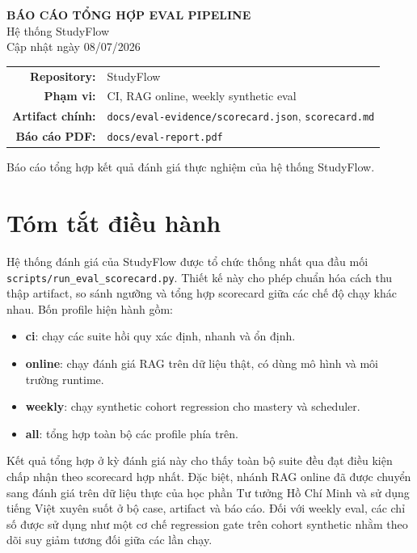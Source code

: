 \documentclass[12pt,a4paper]{article}
\begin{document}
\begin{titlepage}
\centering
{\LARGE \textbf{BÁO CÁO TỔNG HỢP EVAL PIPELINE}}\\[0.8em]
{\Large Hệ thống StudyFlow}\\[1.2em]
{\large Cập nhật ngày 08/07/2026}\\[2em]
\begin{tabular}{rl}
\textbf{Repository:} & StudyFlow \\
\textbf{Phạm vi:} & CI, RAG online, weekly synthetic eval \\
\textbf{Artifact chính:} & \texttt{docs/eval-evidence/scorecard.json}, \texttt{scorecard.md} \\
\textbf{Báo cáo PDF:} & \texttt{docs/eval-report.pdf} \\
\end{tabular}
\vfill
{\large Báo cáo tổng hợp kết quả đánh giá thực nghiệm của hệ thống StudyFlow.}
\end{titlepage}

\section{Tóm tắt điều hành}

Hệ thống đánh giá của StudyFlow được tổ chức thống nhất qua đầu mối \texttt{scripts/run\_eval\_scorecard.py}. Thiết kế này cho phép chuẩn hóa cách thu thập artifact, so sánh ngưỡng và tổng hợp scorecard giữa các chế độ chạy khác nhau. Bốn profile hiện hành gồm:
\begin{itemize}
    \item \textbf{ci}: chạy các suite hồi quy xác định, nhanh và ổn định.
    \item \textbf{online}: chạy đánh giá RAG trên dữ liệu thật, có dùng mô hình và môi trường runtime.
    \item \textbf{weekly}: chạy synthetic cohort regression cho mastery và scheduler.
    \item \textbf{all}: tổng hợp toàn bộ các profile phía trên.
\end{itemize}

Kết quả tổng hợp ở kỳ đánh giá này cho thấy toàn bộ suite đều đạt điều kiện chấp nhận theo scorecard hợp nhất. Đặc biệt, nhánh RAG online đã được chuyển sang đánh giá trên dữ liệu thực của học phần Tư tưởng Hồ Chí Minh và sử dụng tiếng Việt xuyên suốt ở bộ case, artifact và báo cáo. Đối với weekly eval, các chỉ số được sử dụng như một cơ chế regression gate trên cohort synthetic nhằm theo dõi suy giảm tương đối giữa các lần chạy.
\end{document}
